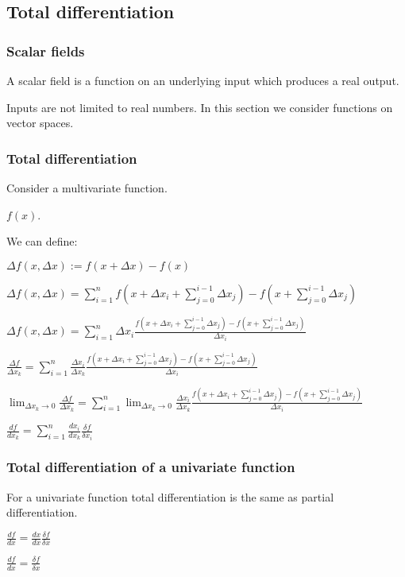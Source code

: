 
\subsection{Total differentiation}

\subsubsection{Scalar fields}

A scalar field is a function on an underlying input which produces a real output.

Inputs are not limited to real numbers. In this section we consider functions on vector spaces.

\subsubsection{Total differentiation}

Consider a multivariate function.

\(f(x)\).

We can define:

\(\Delta f(x, \Delta x):=f(x+\Delta x)-f(x)\)

\(\Delta f(x, \Delta x)=\sum_{i=1}^nf(x+\Delta x_i+\sum_{j=0}^{i-1}\Delta x_j)-f(x+\sum_{j=0}^{i-1}\Delta x_j)\)

\(\Delta f(x, \Delta x)=\sum_{i=1}^n\Delta x_i \frac{f(x+\Delta x_i+\sum_{j=0}^{i-1}\Delta x_j)-f(x+\sum_{j=0}^{i-1}\Delta x_j)}{\Delta x_i}\)

\(\frac{\Delta f}{\Delta x_k}=\sum_{i=1}^n\frac{\Delta x_i}{\Delta x_k} \frac{f(x+\Delta x_i+\sum_{j=0}^{i-1}\Delta x_j)-f(x+\sum_{j=0}^{i-1}\Delta x_j)}{\Delta x_i}\)

\(\lim_{\Delta x_k \rightarrow 0}\frac{\Delta f}{\Delta x_k}=\sum_{i=1}^n\lim_{\Delta x_k \rightarrow 0}\frac{\Delta x_i}{\Delta x_k} \frac{f(x+\Delta x_i+\sum_{j=0}^{i-1}\Delta x_j)-f(x+\sum_{j=0}^{i-1}\Delta x_j)}{\Delta x_i}\)

\(\frac{df}{dx_k}=\sum_{i=1}^n\frac{dx_i}{dx_k} \frac{\delta f}{\delta x_i}\)

\subsubsection{Total differentiation of a univariate function}

For a univariate function total differentiation is the same as partial differentiation.

\(\frac{df}{dx}=\frac{dx}{dx} \frac{\delta f}{\delta x}\)

\(\frac{df}{dx}=\frac{\delta f}{\delta x}\)

